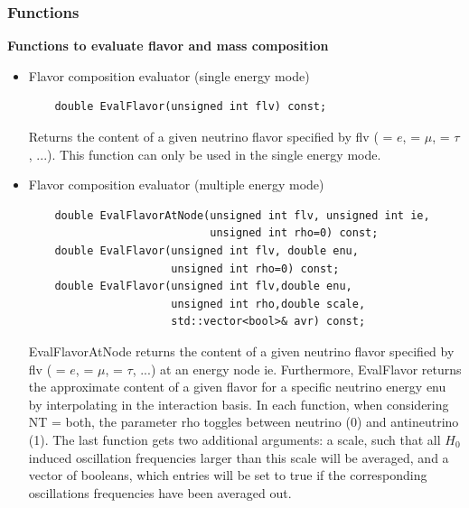 \documentclass[3p,12pt]{elsarticle}
\newcommand{\ttf}{\ttfamily}
\begin{document}
\subsubsection{Functions}

\textbf{Functions to evaluate flavor and mass composition}

\begin{itemize}
\item Flavor composition evaluator (single energy mode)
  \begin{lstlisting}
    double EvalFlavor(unsigned int flv) const;
  \end{lstlisting}
Returns the content of a given neutrino flavor specified by {\ttfamily
  flv} ({ = $e$}, { = $\mu$}, { =
  $\tau$}, ...). This function can only be used in the single energy
mode. 
\item Flavor composition evaluator (multiple energy mode)
  \begin{lstlisting}
    double EvalFlavorAtNode(unsigned int flv, unsigned int ie, 
                            unsigned int rho=0) const;
    double EvalFlavor(unsigned int flv, double enu,
                      unsigned int rho=0) const;
    double EvalFlavor(unsigned int flv,double enu,
                      unsigned int rho,double scale,
                      std::vector<bool>& avr) const;
  \end{lstlisting}
{\ttfamily EvalFlavorAtNode} returns the content of a given neutrino
flavor specified by {\ttfamily flv} ({ = $e$}, {
  = $\mu$}, { = $\tau$, ...}) at an energy node {\ttfamily
  ie}. Furthermore, {\ttfamily EvalFlavor} returns the approximate
content of a given flavor for a specific neutrino energy  {\ttf enu}
by interpolating in the interaction basis. In each function, when
considering  {\ttf  NT = both}, the parameter {\ttf rho} toggles
between {\ttf neutrino (0)} and {\ttf antineutrino (1)}.
The last function gets two additional arguments: a {\ttf scale}, such
that all $H_0$ induced oscillation frequencies larger than this scale
will be averaged, and a vector of booleans, which entries will be set to
true if the corresponding oscillations frequencies have been averaged
out.


\end{itemize}
\end{document}
